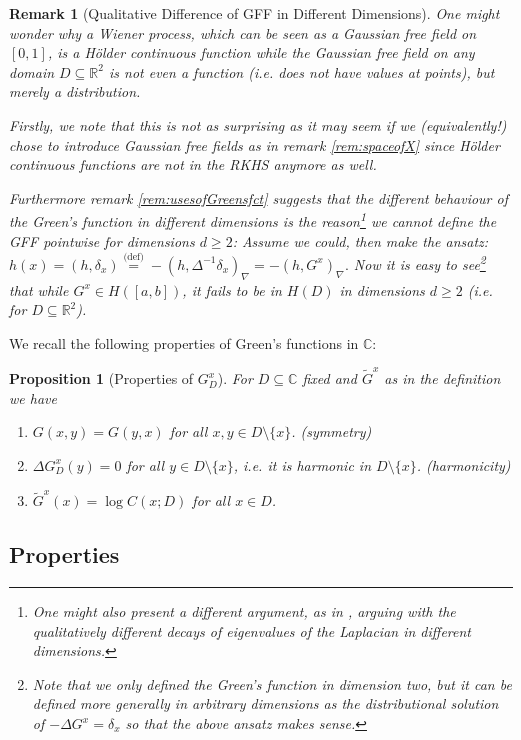 \documentclass[11pt,reqno]{amsart}
\numberwithin{equation}{section}
\newtheorem{pro}[thm]{Proposition}
\newtheorem{rem}[thm]{Remark}
\newcommand{\eqbydef}{\mathrel{\stackrel{\text{(def)}}{=}}}
\begin{document}
\begin{rem}[Qualitative Difference of GFF in Different Dimensions]
	One might wonder why a Wiener process, which can be seen as a Gaussian free field on $[0,1]$, is a H\"older continuous function while the Gaussian free field on any domain $D\subseteq \mathbb R^2$ is not even a function (i.e. does not have values at points), but merely a distribution.
	
	Firstly, we note that this is not as surprising as it may seem if we (equivalently!) chose to introduce Gaussian free fields as in remark \ref{rem:spaceofX} since H\"older continuous functions are not in the RKHS anymore as well.
	
	Furthermore remark \ref{rem:usesofGreensfct} suggests that the different behaviour of the Green's function in different dimensions is the reason\footnote{One might also present a different argument, as in \cite{She07}, arguing with the qualitatively different decays of eigenvalues of the Laplacian in different dimensions.} we cannot define the GFF pointwise for dimensions $d\geq 2$: Assume we could, then make the ansatz: $h(x)=(h,\delta_x)\eqbydef -(h,\Delta^{-1}\delta_x)_\nabla = -(h,G^x)_\nabla.$ Now it is easy to see\footnote{Note that we only defined the Green's function in dimension two, but it can be defined more generally in arbitrary dimensions as the distributional solution of $-\Delta G^x=\delta_x$ so that the above ansatz makes sense.} that while $G^x\in H([a,b])$, it fails to be in $H(D)$ in dimensions $d\geq 2$ (i.e. for $D\subseteq\mathbb R^2$).
\end{rem}

We recall the following properties of Green's functions in $\mathbb C$:

\begin{pro}[Properties of $G_D^x$]\label{prop:propertiesofGreensfcts} For $D\subseteq\mathbb C$ fixed and $\tilde G^x$ as in the definition we have
	\begin{enumerate}
		\item $G(x,y) = G(y,x)$ for all $x,y\in D\setminus\{x\}$. (symmetry)
		\item $\Delta G_D^x(y)=0$ for all $y\in D\setminus\{x\}$, i.e. it is harmonic in $D\setminus\{x\}$. (harmonicity)
		\item\label{item:GreensfctatXisconfRadius} $\tilde G^x(x)=\log C(x;D)$ for all $x\in D$.
	\end{enumerate}
\end{pro}

\subsection{Properties}
\end{document}
